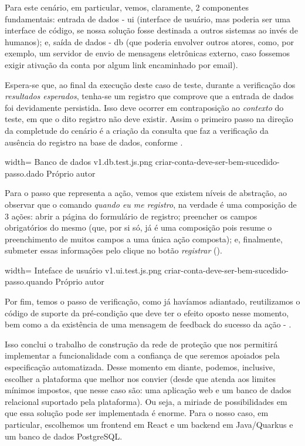  Para este cenário, em particular, vemos, claramente, 2 componentes fundamentais: entrada de dados - ui (interface de usuário, mas poderia ser uma interface de código, se nossa solução fosse destinada a outros sistemas ao invés de humanos); e, saída de dados - db (que poderia envolver outros atores, como, por exemplo, um servidor de envio de mensagens eletrônicas externo, caso fossemos exigir ativação da conta por algum link encaminhado por email).

  Espera-se que, ao final da execução deste caso de teste, durante a verificação dos \emph{resultados esperados}, tenha-se um registro que comprove que a entrada de dados foi devidamente persistida. Isso deve ocorrer em contraposição ao \emph{contexto} do teste, em que o dito registro não deve existir. Assim o primeiro passo na direção da completude do cenário é a criação da consulta que faz a verificação da ausência do registro na base de dados, conforme .

  \imagem
    {width=\textwidth}
    {Banco de dados}
    {v1.db.test.js.png}
    {criar-conta-deve-ser-bem-sucedido-passo.dado}
    {Próprio autor}

  Para o passo que representa a ação, vemos que existem níveis de abstração, ao observar que o comando \emph{quando eu me registro}, na verdade é uma composição de 3 ações: abrir a página do formulário de registro; preencher os campos obrigatórios do mesmo (que, por si só, já é uma composição pois resume o preenchimento de muitos campos a uma única ação composta); e, finalmente, submeter essas informações pelo clique no botão \emph{registrar} ().

  \imagem
    {width=\textwidth}
    {Inteface de usuário}
    {v1.ui.test.js.png}
    {criar-conta-deve-ser-bem-sucedido-passo.quando}
    {Próprio autor}

  Por fim, temos o passo de verificação, como já havíamos adiantado, reutilizamos o código de suporte da pré-condição que deve ter o efeito oposto nesse momento, bem como a da existência de uma mensagem de feedback do sucesso da ação - .

  Isso conclui o trabalho de construção da rede de proteção que nos permitirá implementar a funcionalidade com a confiança de que seremos apoiados pela especificação automatizada. Desse momento em diante, podemos, inclusive, escolher a plataforma que melhor nos convier (desde que atenda aos limites mínimos impostos, que nesse caso são: uma aplicação web e um banco de dados relacional suportado pela plataforma). Ou seja, a miriade de possibilidades em que essa solução pode ser implementada é enorme. Para o nosso caso, em particular, escolhemos um frontend em React e um backend em Java/Quarkus e um banco de dados PostgreSQL.

